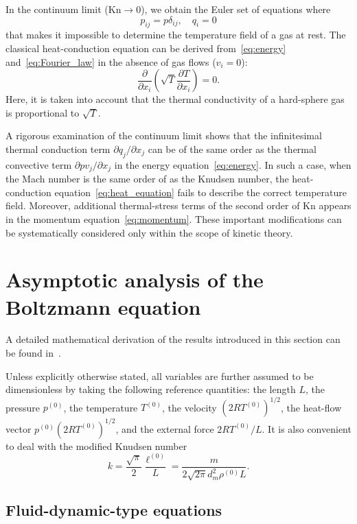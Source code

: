 \documentclass[smallextended, referee]{svjour3} %
\newcommand{\Kn}{\mathrm{Kn}}
\newcommand{\pder}[2][]{\frac{\partial#1}{\partial#2}}
\newcommand{\Pder}[2][]{\partial#1/\partial#2}
\begin{document}
In the continuum limit (\(\Kn\to0\)), we obtain the Euler set of equations where
\begin{equation}
    p_{ij} = p\delta_{ij}, \quad q_i = 0
\end{equation}
that makes it impossible to determine the temperature field of a gas at rest.
The classical heat-conduction equation
can be derived from~\eqref{eq:energy} and~\eqref{eq:Fourier_law}
in the absence of gas flows (\(v_i = 0\)):
\begin{equation}\label{eq:heat_equation}
    \pder{x_i}\left(\sqrt{T}\pder[T]{x_i}\right) = 0.
\end{equation}
Here, it is taken into account that the thermal conductivity of a hard-sphere gas
is proportional to \(\sqrt{T}\).

A rigorous examination of the continuum limit shows that the infinitesimal thermal conduction term \(\Pder[q_j]{x_j}\)
can be of the same order as the thermal convective term \(\Pder[pv_j]{x_j}\) in the energy equation~\eqref{eq:energy}.
In such a case, when the Mach number is the same order of as the Knudsen number,
the heat-conduction equation~\eqref{eq:heat_equation} fails to describe
the correct temperature field. Moreover, additional thermal-stress terms of the second order of \(\Kn\)
appears in the momentum equation~\eqref{eq:momentum}.
These important modifications can be systematically considered only within the scope of kinetic theory.

\section{Asymptotic analysis of the Boltzmann equation}

A detailed mathematical derivation of the results introduced in this section
can be found in~\cite{Sone2002, Sone2007}.

Unless explicitly otherwise stated, all variables are further assumed to be dimensionless
by taking the following reference quantities:
the length \(L\), the pressure \(p^{(0)}\), the temperature \(T^{(0)}\),
the velocity \((2RT^{(0)})^{1/2}\), the heat-flow vector \(p^{(0)}(2RT^{(0)})^{1/2}\),
and the external force \(2RT^{(0)}/L\).
It is also convenient to deal with the modified Knudsen number
\[ k = \frac{\sqrt\pi}2\frac{\ell^{(0)}}{L} = \frac{m}{2\sqrt{2\pi} d_m^2 \rho^{(0)}L}. \]

\subsection{Fluid-dynamic-type equations}
\end{document}
